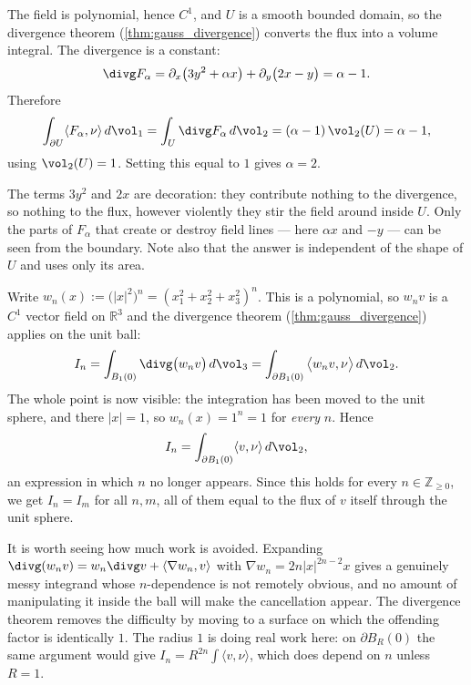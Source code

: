 \begin{exercisesolution}
\label{sol:tuning_alpha_prescribed_flux}
The field is polynomial, hence $C^1$, and $U$ is a smooth bounded domain, so the divergence theorem
(\cref{thm:gauss_divergence}) converts the flux into a volume integral. The divergence is a constant:
\[\divg F_\alpha = \partial_x\big(3y^2 + \alpha x\big) + \partial_y\big(2x - y\big) = \alpha - 1 .\]
Therefore
\[\int_{\partial U} \langle F_\alpha, \nu\rangle \, d\vol_1 = \int_U \divg F_\alpha \, d\vol_2
  = (\alpha - 1)\,\vol_2(U) = \alpha - 1,\]
using $\vol_2(U) = 1$. Setting this equal to $1$ gives $\boxed{\alpha = 2}$.
\begin{remark}
The terms $3y^2$ and $2x$ are decoration: they contribute nothing to the divergence, so nothing to
the flux, however violently they stir the field around inside $U$. Only the parts of $F_\alpha$ that
create or destroy field lines --- here $\alpha x$ and $-y$ --- can be seen from the boundary. Note
also that the answer is independent of the shape of $U$ and uses only its area.
\end{remark}
\end{exercisesolution}

\begin{exercisesolution}
\label{sol:radial_weight_flux_independent}
Write $w_n(x) := \big(\lvert x\rvert^2\big)^n = (x_1^2+x_2^2+x_3^2)^n$. This is a polynomial, so
$w_n v$ is a $C^1$ vector field on $\mathbb{R}^3$ and the divergence theorem
(\cref{thm:gauss_divergence}) applies on the unit ball:
\[I_n = \int_{B_1(0)} \divg\big(w_n v\big) \, d\vol_3
      = \int_{\partial B_1(0)} \big\langle w_n v, \nu\big\rangle \, d\vol_2 .\]
The whole point is now visible: the integration has been moved to the unit sphere, and there
$\lvert x\rvert = 1$, so $w_n(x) = 1^n = 1$ for \emph{every} $n$. Hence
\[I_n = \int_{\partial B_1(0)} \langle v, \nu\rangle \, d\vol_2 ,\]
an expression in which $n$ no longer appears. Since this holds for every $n \in \mathbb{Z}_{\ge0}$,
we get $I_n = I_m$ for all $n, m$, all of them equal to the flux of $v$ itself through the unit
sphere.
\begin{ainote}
It is worth seeing how much work is avoided. Expanding $\divg(w_n v) = w_n \divg v + \langle \nabla
w_n, v\rangle$ with $\nabla w_n = 2n\lvert x\rvert^{2n-2}x$ gives a genuinely messy integrand whose
$n$-dependence is not remotely obvious, and no amount of manipulating it inside the ball will make
the cancellation appear. The divergence theorem removes the difficulty by moving to a surface on
which the offending factor is identically $1$. The radius $1$ is doing real work here: on
$\partial B_R(0)$ the same argument would give $I_n = R^{2n}\int\langle v,\nu\rangle$, which does
depend on $n$ unless $R = 1$.
\end{ainote}
\end{exercisesolution}

